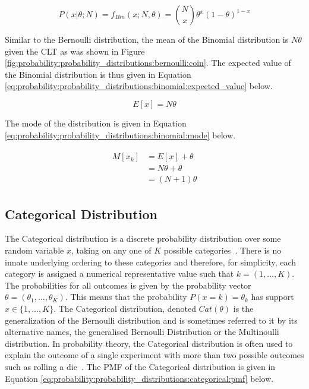 \begin{equation}
      \label{eq:probability:probability_distributions:binomial:pmf}
      P(x \vert \theta; N) = f_{Bin}(x; N, \theta) = \binom{N}{x} \theta^{x}(1-\theta)^{1-x}
\end{equation}

Similar to the Bernoulli distribution, the mean of the Binomial distribution is $N\theta$ given the \ac{CLT} as was shown in Figure \ref{fig:probability:probability_distributions:bernoulli:coin}. The expected value of the Binomial distribution is thus given in Equation \ref{eq:probability:probability_distributions:binomial:expected_value} below.

\begin{equation}
      \label{eq:probability:probability_distributions:binomial:expected_value}
      E[x] = N\theta
\end{equation}

The mode of the distribution is given in Equation \ref{eq:probability:probability_distributions:binomial:mode} below.

\begin{align}
      \label{eq:probability:probability_distributions:binomial:mode}
      \begin{split}
            M[x_{k}] &= E[x] + \theta \\
            &= N\theta  + \theta \\
            &= (N  + 1)\theta
      \end{split}
\end{align}



\subsection{Categorical Distribution}
\label{sec:probability:probability_distributions:categorical}

The Categorical distribution is a discrete probability distribution over some random variable $x$, taking on any one of $K$ possible categories~\cite{ref:wackerly:2014}. There is no innate underlying ordering to these categories and therefore, for simplicity, each category is assigned a numerical representative value such that $k = (1, \dots, K)$. The probabilities for all outcomes is given by the probability vector $\theta = (\theta_{1}, \dots, \theta_{K})$.  This means that the probability $P(x=k)=\theta_{k}$ has support $x \in \{1, \dots, K\}$. The Categorical distribution, denoted $Cat(\theta)$ is the generalization of the Bernoulli distribution and is sometimes referred to it by its alternative names, the generalised Bernoulli Distribution or the Multinoulli distribution. In probability theory, the Categorical distribution is often used to explain the outcome of a single experiment with more than two possible outcomes such as rolling a die~\cite{ref:wackerly:2014}. The \ac{PMF} of the Categorical distribution is given in Equation \ref{eq:probability:probability_distributions:categorical:pmf} below.

